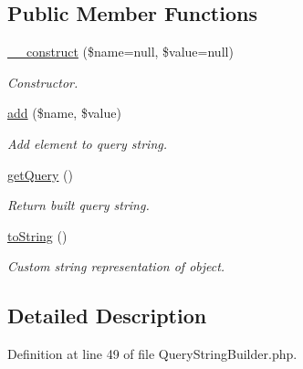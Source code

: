 \subsection*{Public Member Functions}
\begin{DoxyCompactItemize}
\item 
\hyperlink{classTune_1_1Management_1_1Service_1_1QueryStringBuilder_ad4e5640aace6fb5d999195d9029bdc88}{\-\_\-\-\_\-construct} (\$name=null, \$value=null)
\begin{DoxyCompactList}\small\item\em Constructor. \end{DoxyCompactList}\item 
\hyperlink{classTune_1_1Management_1_1Service_1_1QueryStringBuilder_ad0f758b9a51e0c2161ef9bc58b583220}{add} (\$name, \$value)
\begin{DoxyCompactList}\small\item\em Add element to query string. \end{DoxyCompactList}\item 
\hyperlink{classTune_1_1Management_1_1Service_1_1QueryStringBuilder_a954b3cb29176e7c64598e8e633dfc0a0}{get\-Query} ()
\begin{DoxyCompactList}\small\item\em Return built query string. \end{DoxyCompactList}\item 
\hyperlink{classTune_1_1Management_1_1Service_1_1QueryStringBuilder_a74ffb882dd3a710fc2fc8cf7f715c5ed}{to\-String} ()
\begin{DoxyCompactList}\small\item\em Custom string representation of object. \end{DoxyCompactList}\end{DoxyCompactItemize}


\subsection{Detailed Description}


Definition at line 49 of file Query\-String\-Builder.\-php.



